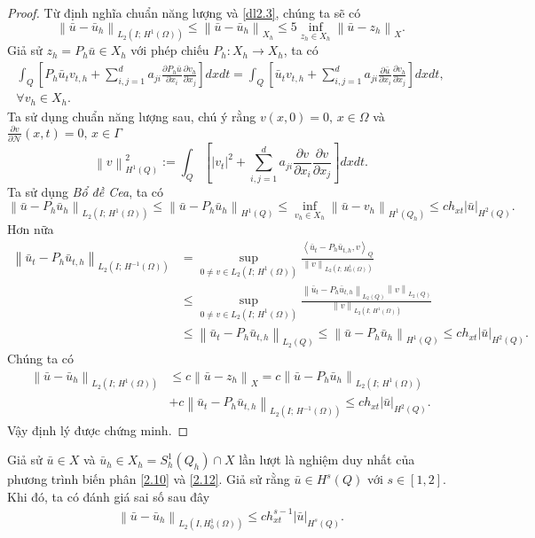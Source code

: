 \documentclass[]{article}
\begin{document}
\begin{proof}
	Từ định nghĩa chuẩn năng lượng và \cref{dl2.3}, chúng ta sẽ có
	$$\left\|\bar{u}-\bar{u}_h\right\|_{L_2(I;\, H^1(\Omega))}\leq \left\|\bar{u}-\bar{u}_h\right\|_{X_h}\leq 5\inf_{z_h\in X_h}\left\|\bar{u}-z_h\right\|_{X}.$$
	Giả sử $z_h=P_h\bar{u}\in X_h$ với phép chiếu $P_h: X_h\to X_h$, ta có
	\begin{align*}
	\int_{Q}\left[P_h\bar{u}_t v_{t, h}+\sum_{i, j=1}^d a_{ji}\frac{\partial P_h\bar{u}}{\partial x_i}\frac{\partial v_h}{\partial x_j}\right]dxdt=\int_{Q}\left[\bar{u}_tv_{t, h}+\sum_{i, j=1}^d a_{ji}\frac{\partial \bar{u}}{\partial x_i}\frac{\partial v_h}{\partial x_j}\right]dxdt,\\\forall v_h\in X_h.
	\end{align*}
	Ta sử dụng chuẩn năng lượng sau, chú ý rằng $v(x, 0)=0, \, x\in \Omega$ và $\frac{\partial v}{\partial \mathcal{N}}(x, t)=0,\,x\in \Gamma$
	$$\left\|v\right\|_{H^1(Q)}^2:=\int_{Q}\left[\left|v_t\right|^2+\sum_{i, j=1}^d a_{ji}\frac{\partial v}{\partial x_i}\frac{\partial v}{\partial x_j}\right]dxdt.$$
	Ta sử dụng \textit{Bổ đề Cea}, ta có
	$$\left\|\bar{u}-P_h\bar{u}_h\right\|_{L_2(I;\,H^1(\Omega))}\leq\left\|\bar{u}-P_h\bar{u}_h\right\|_{H^1(Q)}\leq \inf_{v_h\in X_h}\left\|\bar{u}-v_h\right\|_{H^1(Q_h)}\leq ch_{xt}\left|\bar{u}\right|_{H^2(Q)}.$$
	Hơn nữa
	\begin{align*}
	\left\|\bar{u}_t-P_h\bar{u}_{t, h}\right\|_{L_2(I;\, H^{-1}(\Omega))}&=\sup_{0\neq v\in L_2(I;\, H^1(\Omega))}\frac{\left\langle\bar{u}_t-P_h\bar{u}_{t, h}, v \right\rangle_Q}{\left\|v\right\|_{L_2(I;\, H_0^1(\Omega))}}\\
	&\leq \sup_{0\neq v\in L_2(I;\, H^1(\Omega))}\frac{\left\|\bar{u}_t-P_h\bar{u}_{t, h}\right\|_{L_2(Q)}\left\|v\right\|_{L_2(Q)}}{\left\|v\right\|_{L_2(I;\, H^1(\Omega))}}\\
	&\leq \left\|\bar{u}_t-P_h\bar{u}_{t, h}\right\|_{L_2(Q)}\leq \left\|\bar{u}-P_h\bar{u}_h\right\|_{H^1(Q)}\leq ch_{xt}\left|\bar{u}\right|_{H^2(Q)}.
	\end{align*}
	Chúng ta có
	\begin{align*}
	\left\|\bar{u}-\bar{u}_h\right\|_{L_2(I;\, H^1(\Omega))}&\leq c\left\|\bar{u}-z_h\right\|_{X}=c\left\|\bar{u}-P_h\bar{u}_h\right\|_{L_2(I;\,H^1(\Omega))}\\&+c\left\|\bar{u}_t-P_h\bar{u}_{t, h}\right\|_{L_2(I;\, H^{-1}(\Omega))}\leq ch_{xt}\left|\bar{u}\right|_{H^2(Q)}.
	\end{align*}
	Vậy định lý được chứng minh.
\end{proof}
\begin{hq}\label{hq2.3}
	Giả sử $\bar{u}\in X$ và $\bar{u}_h\in X_h=S^1_h(Q_h)\cap X$ lần lượt là nghiệm duy nhất của phương trình biến phân \eqref{2.10} và \eqref{2.12}. Giả sử rằng $\bar{u}\in H^s(Q)$ với $s\in[1, 2]$. Khi đó, ta có đánh giá sai số sau đây
	\begin{align}\label{2.18}
	\left\|\bar{u}-\bar{u}_h \right\|_{L_2(I, H^1_0(\Omega))}\leq ch^{s-1}_{xt}\left|\bar{u}\right|_{H^s(Q)}.
	\end{align}
\end{hq}
\end{document}
